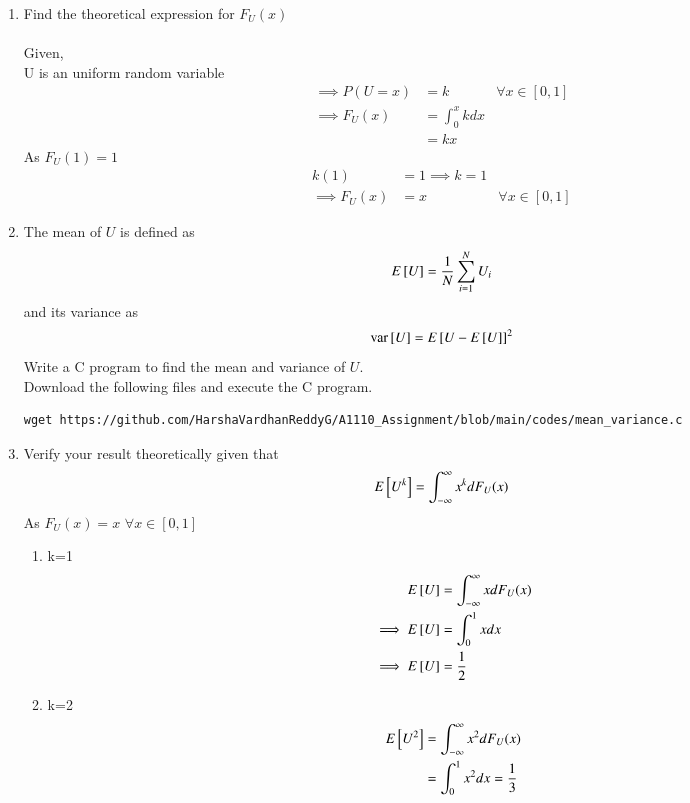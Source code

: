 \documentclass[journal,12pt,twocolumn]{IEEEtran}
\renewcommand\thesection{\arabic{section}}
\begin{document}
\begin{enumerate}[label=\thesection.\arabic*
,ref=\thesection.\theenumi]
\item Find the theoretical expression for $F_U(x)$ \\
\solution\\
Given,\\
U is an uniform random variable
\begin{align}
    \implies P(U=x) &= k & \forall x \in [0,1]\\
    \implies F_U(x) &= \int_0^x k dx\\
    &=kx
\end{align}
As $F_U(1)=1$
\begin{align}
    k(1)&=1\implies k=1\\
    \implies F_U(x)&=x &\forall x \in [0,1] \label{eq1}
\end{align}
\item
The mean of $U$ is defined as
%
\begin{equation}
E{}\left[U\right] = \frac{1}{N}\sum_{i=1}^{N}U_i
\end{equation}
%
and its variance as
%
\begin{equation}
\text{var}{}\left[U\right] = E{}\left[U- E{}\left[U\right]\right]^2 
\end{equation}
Write a C program to  find the mean and variance of $U$. \\
\solution Download the following files and execute the  C program.
\begin{lstlisting}
wget https://github.com/HarshaVardhanReddyG/A1110_Assignment/blob/main/codes/mean_variance.c
\end{lstlisting}
\item Verify your result theoretically given that
\begin{equation}
E{}\left[U^k\right] = \int_{-\infty}^{\infty}x^kdF_{U}(x)
\end{equation}
\solution 
As $F_U(x) = x$ $\forall x \in [0,1]$
\begin{enumerate}
    \item k=1
    \begin{align}
        E{}\left[U\right] &= \int_{-\infty}^{\infty}xdF_{U}(x)\\
        \implies E{}\left[U\right] &= \int_{0}^{1}xdx\\
        \implies E{}\left[U\right] &=\frac{1}{2}
    \end{align}
    \item k=2
    \begin{align}
        E\sbrak{U^2} &= \int_{-\infty}^{\infty}x^2dF_{U}(x)\\
        &=\int_0^1x^2dx=\frac{1}{3}\\

\end{align}
\end{enumerate}
\end{enumerate}
\end{document}
